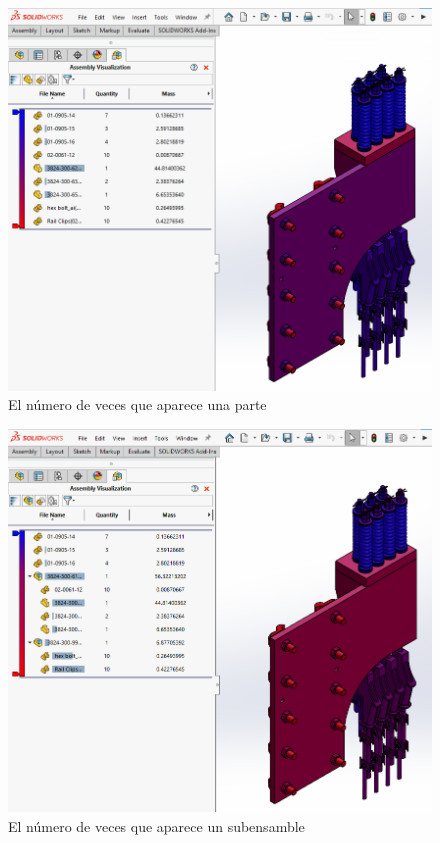 \documentclass[12pt,letterpaper,final]{report}
\begin{document}
\begin{figure}[H]
	\centering
	\includegraphics[width=0.95\linewidth, height=0.5\textheight,keepaspectratio]{Imagenes/solidworks_assemblyvisualization02}
	\caption{El número de veces que aparece una parte}
	\label{fig:solidworksassemblyvisualization02}
\end{figure}

\begin{figure}[H]
	\centering
	\includegraphics[width=0.95\linewidth, height=0.5\textheight,keepaspectratio]{Imagenes/solidworks_assemblyvisualization03}
	\caption{El número de veces que aparece un subensamble}
	\label{fig:solidworksassemblyvisualization03}
\end{figure}
\end{document}
